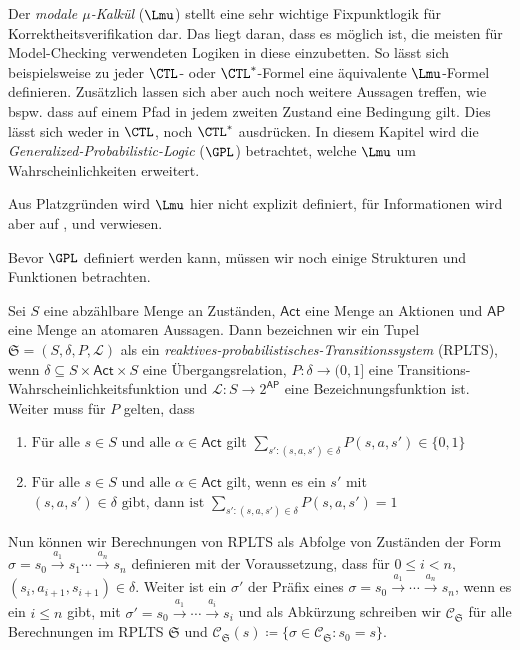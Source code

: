 Der \textit{modale $\mu$-Kalkül} ($\Lmu$) stellt eine sehr wichtige Fixpunktlogik für Korrektheitsverifikation dar.
Das liegt daran, dass es möglich ist, die meisten für Model-Checking verwendeten Logiken in diese einzubetten. So lässt sich beispielsweise zu jeder $\CTL$- oder $\CTL^*$-Formel eine äquivalente $\Lmu$-Formel definieren.
Zusätzlich lassen sich aber auch noch weitere Aussagen treffen, wie bspw. dass auf einem Pfad in jedem zweiten Zustand eine Bedingung gilt.
Dies lässt sich weder in $\CTL$, noch $\CTL^*$ ausdrücken. \cite{cleaveland2005probabilistic}
In diesem Kapitel wird die \textit{Generalized-Probabilistic-Logic} ($\GPL$) betrachtet, welche $\Lmu$ um Wahrscheinlichkeiten erweitert.

Aus Platzgründen wird $\Lmu$ hier nicht explizit definiert, für Informationen wird aber auf \cite{stirling1991local}, \cite{kozen1983results} und \cite{emerson1991real} verwiesen.

Bevor $\GPL$ definiert werden kann, müssen wir noch einige Strukturen und Funktionen betrachten.

\begin{definition}
	Sei $S$ eine abzählbare Menge an Zuständen, $\mathsf{Act}$ eine Menge an Aktionen und $\mathsf{AP}$ eine Menge an atomaren Aussagen.
	Dann bezeichnen wir ein Tupel $\mathfrak{S}=(S,\delta,P,\mathcal{L})$ als ein \textit{reaktives-probabilistisches-Transitionssystem} (RPLTS), wenn $\delta\subseteq S\times \mathsf{Act} \times S$ eine Übergangsrelation, $P:\delta\to (0,1]$ eine Transitions-Wahrscheinlichkeitsfunktion und $\mathcal{L}:S\to2^{\mathsf{AP}}$ eine Bezeichnungsfunktion ist.
	Weiter muss für $P$ gelten, dass
	\begin{enumerate}
		\item $\text{Für alle }s\in S\text{ und alle }\alpha\in \mathsf{Act}$ gilt $\sum_{s' : (s,a,s')\in \delta} P(s,a,s')\in \{0,1\}$
		\item $\text{Für alle }s\in S\text{ und alle }\alpha\in \mathsf{Act}$ gilt, wenn es ein $s'$ mit $(s,a,s')\in \delta \text{ gibt, dann ist}$ $\sum_{s' : (s,a,s')\in \delta} P(s,a,s') = 1$ \cite{cleaveland2005probabilistic}
	\end{enumerate}
\end{definition}

Nun können wir Berechnungen von RPLTS als Abfolge von Zuständen der Form $\sigma = s_0\xrightarrow{a_1}s_1 \cdots \xrightarrow{a_n}s_n$ definieren mit der Voraussetzung, dass für $0\leq i <n$, $(s_i,a_{i+1},s_{i+1})\in \delta$.
Weiter ist ein $\sigma'$ der Präfix eines $\sigma=s_0\xrightarrow{a_1} \cdots \xrightarrow{a_n}s_n$, wenn es ein $i\leq n$ gibt, mit $\sigma' = s_0\xrightarrow{a_1}\cdots \xrightarrow{a_i}s_i$ und als Abkürzung schreiben wir $\mathcal{C}_\mathfrak{S}$ für alle Berechnungen im RPLTS $\mathfrak{S}$ und $\mathcal{C}_\mathfrak{S}(s)\coloneqq \{\sigma\in \mathcal{C}_\mathfrak{S} : s_0=s\}$. \cite{cleaveland2005probabilistic}

